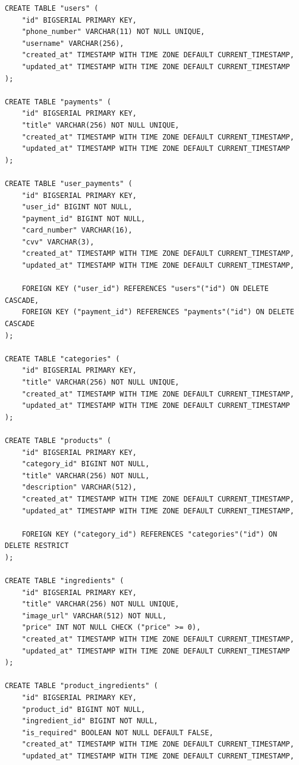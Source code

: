 \documentclass[a4paper,14pt]{extarticle}
\begin{document}
  \noindent
  \begin{Verbatim}[tabsize=4,fontsize=\small]
CREATE TABLE "users" (
    "id" BIGSERIAL PRIMARY KEY,
    "phone_number" VARCHAR(11) NOT NULL UNIQUE,
    "username" VARCHAR(256),
    "created_at" TIMESTAMP WITH TIME ZONE DEFAULT CURRENT_TIMESTAMP,
    "updated_at" TIMESTAMP WITH TIME ZONE DEFAULT CURRENT_TIMESTAMP
);

CREATE TABLE "payments" (
    "id" BIGSERIAL PRIMARY KEY,
    "title" VARCHAR(256) NOT NULL UNIQUE,
    "created_at" TIMESTAMP WITH TIME ZONE DEFAULT CURRENT_TIMESTAMP,
    "updated_at" TIMESTAMP WITH TIME ZONE DEFAULT CURRENT_TIMESTAMP
);

CREATE TABLE "user_payments" (
    "id" BIGSERIAL PRIMARY KEY,
    "user_id" BIGINT NOT NULL,
    "payment_id" BIGINT NOT NULL,
    "card_number" VARCHAR(16),
    "cvv" VARCHAR(3),
    "created_at" TIMESTAMP WITH TIME ZONE DEFAULT CURRENT_TIMESTAMP,
    "updated_at" TIMESTAMP WITH TIME ZONE DEFAULT CURRENT_TIMESTAMP,

    FOREIGN KEY ("user_id") REFERENCES "users"("id") ON DELETE CASCADE,
    FOREIGN KEY ("payment_id") REFERENCES "payments"("id") ON DELETE CASCADE
);

CREATE TABLE "categories" (
    "id" BIGSERIAL PRIMARY KEY,
    "title" VARCHAR(256) NOT NULL UNIQUE,
    "created_at" TIMESTAMP WITH TIME ZONE DEFAULT CURRENT_TIMESTAMP,
    "updated_at" TIMESTAMP WITH TIME ZONE DEFAULT CURRENT_TIMESTAMP
);

CREATE TABLE "products" (
    "id" BIGSERIAL PRIMARY KEY,
    "category_id" BIGINT NOT NULL,
    "title" VARCHAR(256) NOT NULL,
    "description" VARCHAR(512),
    "created_at" TIMESTAMP WITH TIME ZONE DEFAULT CURRENT_TIMESTAMP,
    "updated_at" TIMESTAMP WITH TIME ZONE DEFAULT CURRENT_TIMESTAMP,

    FOREIGN KEY ("category_id") REFERENCES "categories"("id") ON DELETE RESTRICT
);

CREATE TABLE "ingredients" (
    "id" BIGSERIAL PRIMARY KEY,
    "title" VARCHAR(256) NOT NULL UNIQUE,
    "image_url" VARCHAR(512) NOT NULL,
    "price" INT NOT NULL CHECK ("price" >= 0),
    "created_at" TIMESTAMP WITH TIME ZONE DEFAULT CURRENT_TIMESTAMP,
    "updated_at" TIMESTAMP WITH TIME ZONE DEFAULT CURRENT_TIMESTAMP
);

CREATE TABLE "product_ingredients" (
    "id" BIGSERIAL PRIMARY KEY,
    "product_id" BIGINT NOT NULL,
    "ingredient_id" BIGINT NOT NULL,
    "is_required" BOOLEAN NOT NULL DEFAULT FALSE,
    "created_at" TIMESTAMP WITH TIME ZONE DEFAULT CURRENT_TIMESTAMP,
    "updated_at" TIMESTAMP WITH TIME ZONE DEFAULT CURRENT_TIMESTAMP,


\end{Verbatim}
\end{document}
